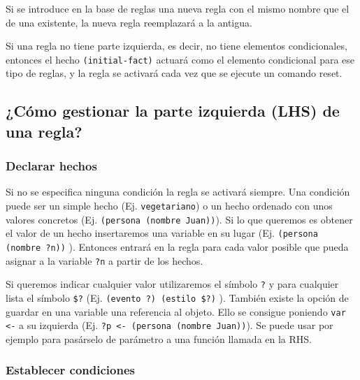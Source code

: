 \documentclass[11pt,svgnames]{scrbook}
\begin{document}
Si se introduce en la base de reglas una nueva regla con el mismo nombre que el de una
existente, la nueva regla reemplazará a la antigua.

Si una regla no tiene parte izquierda, es decir, no tiene elementos condicionales, entonces
el hecho \texttt{(initial-fact)} actuará como el elemento condicional para ese tipo de
reglas, y la regla se activará cada vez que se ejecute un comando reset.


\subsection{¿Cómo gestionar la parte izquierda (LHS) de una regla?}

\subsubsection*{Declarar hechos}


Si no se especifica ninguna condición la regla se activará siempre. 
Una condición puede ser un simple hecho (Ej. \texttt{vegetariano}) o un hecho
ordenado con unos valores concretos (Ej. \texttt{(persona (nombre Juan))}).
Si lo que queremos es obtener el valor de un hecho insertaremos una variable en
su lugar (Ej. \texttt{(persona (nombre ?n))} ). Entonces entrará en la regla
para cada valor posible que pueda asignar a la variable \texttt{?n} a partir de
los
hechos.

Si queremos indicar cualquier valor utilizaremos el símbolo \texttt{?} y para
cualquier
lista el símbolo \texttt{\$?} (Ej. \texttt{(evento ?) (estilo \$?)} ).
También existe la opción de guardar en una variable una referencia al objeto.
Ello se consigue poniendo \texttt{var <-} a su izquierda (Ej. \texttt{?p <-
(persona
(nombre Juan))}). Se puede usar por ejemplo para pasárselo de parámetro a una
función llamada en la RHS.


\subsubsection*{Establecer condiciones}
\end{document}
